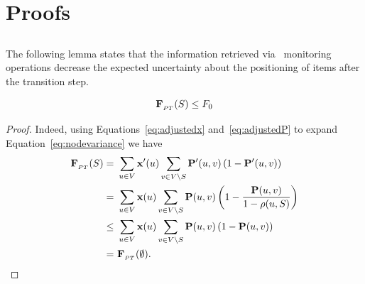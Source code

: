 \appendix

\section{Proofs}

\subsection{}
The following lemma states that the information retrieved via
\parentstransitions\ monitoring operations decrease the expected uncertainty
about the positioning of items after the transition step.

\begin{lemma}
\[
\mathbf{F}_{_{\sc PT}}(S) \leq F_0
\]
\label{lemma:decreased_uncertainty_pt}
\end{lemma}
\begin{proof}
Indeed, using Equations~\eqref{eq:adjustedx} and~\eqref{eq:adjustedP} to expand 
Equation~\eqref{eq:nodevariance} we have
\begin{align}
\mathbf{F}_{_{\sc PT}}(S) =\ & \sum_{u\in V}\mathbf{x}^{\prime}(u)\sum_{v\in V\setminus S}\mathbf{P}^{\prime}(u,v)\left(1-\mathbf{P}^{\prime}(u,v)\right) \nonumber \\
  =\ & \sum_{u\in V}\mathbf{x}(u)\sum_{v\in V\setminus S}\mathbf{P}(u,v)\left(1-\frac{\mathbf{P}(u,v)}{1-\rho(u,S)}\right) \nonumber  \\
  \leq\ & \sum_{u\in V}\mathbf{x}(u)\sum_{v\in V\setminus S}\mathbf{P}(u,v)\left(1-\mathbf{P}(u,v)\right) \nonumber \\
  =\ & \mathbf{F}_{_{\sc PT}}(\emptyset). \nonumber
\end{align}
\end{proof}


